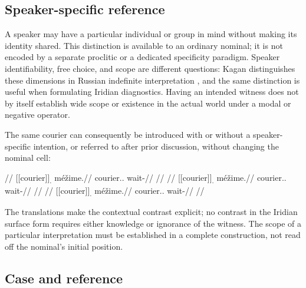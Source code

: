 \subsection{Speaker-specific reference}
\label{sec:nm-spec}

A speaker may have a particular individual or group in mind without making
its identity shared. This distinction is available to an ordinary nominal;
it is not encoded by a separate proclitic or a dedicated specificity
paradigm. Speaker identifiability, free choice, and scope are different
questions: Kagan distinguishes these dimensions in Russian indefinite
interpretation \cite{kagan2011}, and the same distinction is useful when
formulating Iridian diagnostics. Having an intended witness does not by
itself establish wide scope or existence in the actual world under a modal
or negative operator.

The same courier can consequently be introduced with or without a
speaker-specific intention, or referred to after prior discussion, without
changing the nominal cell:

\pex\label{ex:nm-slot-reference-choice}
\a
\begingl
\glpreamble {}//
\gla \textnormal{[[courier]]}\textsubscript{\Dir{}.\Sg{}} méžime.//
\glb courier.\Dir{}.\Sg{} wait-\Prog{}//
\glft {}//
\endgl
\a
\begingl
\glpreamble {}//
\gla \textnormal{[[courier]]}\textsubscript{\Dir{}.\Sg{}} méžime.//
\glb courier.\Dir{}.\Sg{} wait-\Prog{}//
\glft {}//
\endgl
\a
\begingl
\glpreamble {}//
\gla \textnormal{[[courier]]}\textsubscript{\Dir{}.\Sg{}} méžime.//
\glb courier.\Dir{}.\Sg{} wait-\Prog{}//
\glft {}//
\endgl
\xe

The translations make the contextual contrast explicit; no contrast in the
Iridian surface form requires either knowledge or ignorance of the witness.
The scope of a particular interpretation must be established in a complete
construction, not read off the nominal's initial position.

\subsection{Case and reference}
\label{sec:nm-case-reference}

